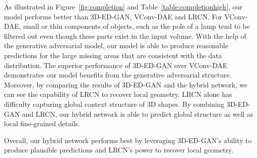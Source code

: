 \documentclass[10pt,twocolumn,letterpaper]{article}
\begin{document}
As illustrated in Figure~\ref{fig:completion} and Table~\ref{table:completionhigh}, our model performs better than 3D-ED-GAN, VConv-DAE and LRCN. For VConv-DAE, small or thin components of objects, such as the pole of a lamp tend to be filtered out even though these parts exist in the input volume. With the help of the generative adversarial model, our model is able to produce reasonable predictions for the large missing areas that are consistent with the data distribution. The superior performance of 3D-ED-GAN over VConv-DAE demonstrates our model benefits from the generative adversarial structure. Moreover, by comparing the results of 3D-ED-GAN and the hybrid network, we can see the capability of LRCN to recover local geometry. LRCN alone has difficulty capturing global context structure of 3D shapes. By combining 3D-ED-GAN and LRCN, our hybrid network is able to predict global structure as well as local fine-grained details.

Overall, our hybrid network performs best by leveraging 3D-ED-GAN's ability to produce plausible predictions and LRCN's power to recover local geometry.
\end{document}
